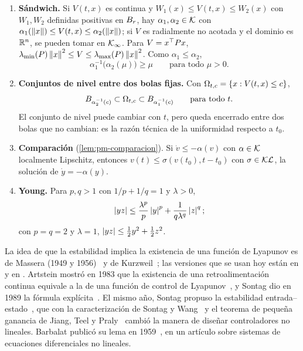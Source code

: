 \begin{enumerate}
  \item[H1.] \textbf{Sándwich.} Si $V(t,x)$ es continua y $W_1(x)\le V(t,x)\le W_2(x)$ con $W_1,W_2$ definidas positivas en $B_{r}$, hay $\alpha_1,\alpha_2\in\mathcal{K}$ con $\alpha_1(\left\lVert x\right\rVert)\le V(t,x)\le\alpha_2(\left\lVert x\right\rVert)$; si $V$ es radialmente no acotada y el dominio es $\mathbb{R}^n$, se pueden tomar en $\mathcal{K}_{\infty}$. Para $V=x^{\top} Px$, $\lambda_{\min}(P)\left\lVert x\right\rVert^2\le V\le\lambda_{\max}(P)\left\lVert x\right\rVert^2$. Como $\alpha_1\le\alpha_2$,
  \begin{equation}
    \alpha_1^{-1}\bigl(\alpha_2(\mu)\bigr)\ge\mu\qquad\text{para todo }\mu>0 .
    \label{eq:av-a1a2}
  \end{equation}
  \item[H2.] \textbf{Conjuntos de nivel entre dos bolas fijas.} Con $\Omega_{t,c}=\{x:V(t,x)\le c\}$,
  \begin{equation}
    B_{\alpha_2^{-1}(c)}\subset\Omega_{t,c}\subset B_{\alpha_1^{-1}(c)}\qquad\text{para todo }t .
    \label{eq:av-inclusiones}
  \end{equation}
  El conjunto de nivel puede cambiar con $t$, pero queda encerrado entre dos bolas que no cambian: es la razón técnica de la uniformidad respecto a $t_0$.
  \item[H3.] \textbf{Comparación} (\cref{lem:pm-comparacion}). Si $\dot v\le-\alpha(v)$ con $\alpha\in\mathcal{K}$ localmente Lipschitz, entonces $v(t)\le\sigma(v(t_0),t-t_0)$ con $\sigma\in\mathcal{KL}$, la solución de $\dot y=-\alpha(y)$.
  \item[H4.] \textbf{Young.} Para $p,q>1$ con $1/p+1/q=1$ y $\lambda>0$,
  \begin{equation}
    \left\lvert yz\right\rvert\le\frac{\lambda^p}{p}\left\lvert y\right\rvert^p+\frac1{q\lambda^q}\left\lvert z\right\rvert^q ;
    \label{eq:av-young}
  \end{equation}
  con $p=q=2$ y $\lambda=1$, $\left\lvert yz\right\rvert\le\tfrac12y^2+\tfrac12z^2$.
\end{enumerate}

\begin{historia}
La idea de que la estabilidad implica la existencia de una función de Lyapunov es de Massera (1949 y 1956)~\citep{Mas49,Mas56} y de Kurzweil~\citep{Kur56}; las versiones que se usan hoy están en \citet[\S4.7]{Kha02} y en \citet[cap.~2]{KeBr23}. Artstein mostró en 1983 que la existencia de una retroalimentación continua equivale a la de una función de control de Lyapunov~\citep{Ars83}, y Sontag dio en 1989 la fórmula explícita~\citep{Son89}. El mismo año, Sontag propuso la estabilidad entrada--estado~\citep{Son89a}, que con la caracterización de Sontag y Wang~\citep{SoWa95} y el teorema de pequeña ganancia de Jiang, Teel y Praly~\citep{JTP94} cambió la manera de diseñar controladores no lineales. Barbalat publicó su lema en 1959~\citep{Bar59}, en un artículo sobre sistemas de ecuaciones diferenciales no lineales.
\end{historia}

